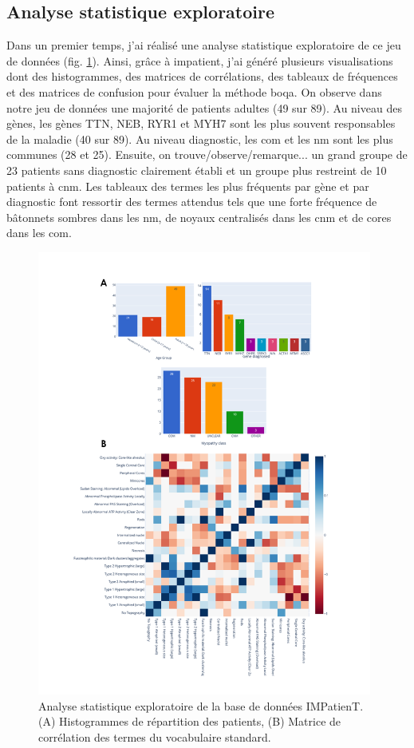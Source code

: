 \subsection{Analyse statistique exploratoire}
Dans un premier temps, j'ai réalisé une analyse statistique exploratoire de ce jeu de données (fig. \ref{fig:impatient_eda}). Ainsi, grâce à \gls{impatient}, j'ai généré plusieurs visualisations dont des histogrammes, des matrices de corrélations, des tableaux de fréquences et des matrices de confusion pour évaluer la méthode \gls{boqa}.  On observe dans notre jeu de données une majorité de patients adultes (49 sur 89). Au niveau des gènes, les gènes TTN, NEB, RYR1 et MYH7 sont les plus souvent responsables de la maladie (40 sur 89). Au niveau diagnostic, les \gls{com} et les \gls{nm} sont les plus communes (28 et 25). Ensuite, on trouve/observe/remarque... un grand groupe de 23 patients sans diagnostic clairement établi et un groupe plus restreint de 10 patients à \gls{cnm}. Les tableaux des termes les plus fréquents par gène et par diagnostic font ressortir des termes attendus tels que une forte fréquence de bâtonnets sombres dans les \gls{nm}, de noyaux centralisés dans les \gls{cnm} et de cores dans les \gls{com}.
\begin{figure}[htbp]
  \centering
  \includegraphics[width=0.98\textwidth]{figures/impatient_explo.png}
  \caption[Analyse statistique exploratoire IMPatienT]{Analyse statistique exploratoire de la base de données IMPatienT. (A) Histogrammes de répartition des patients, (B) Matrice de corrélation des termes du vocabulaire standard.}
  \label{fig:impatient_eda}
\end{figure}
